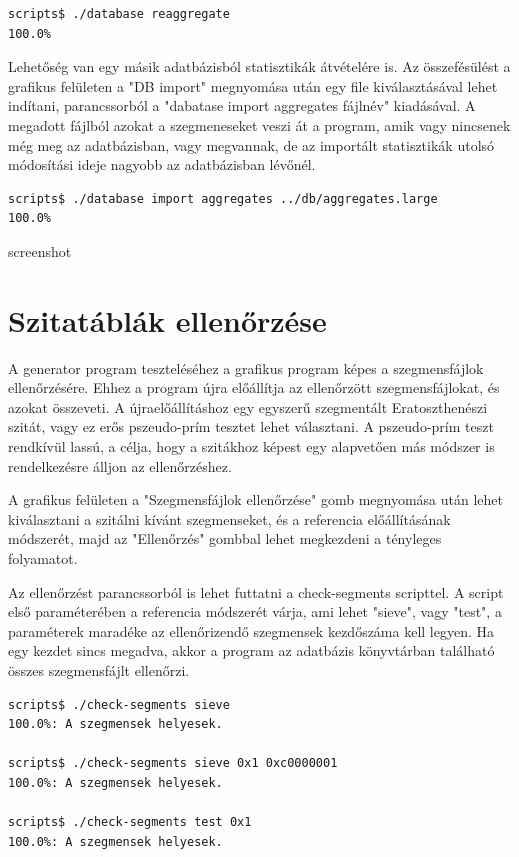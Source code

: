\documentclass[12pt]{report}
\begin{document}
\tiny
\begin{lstlisting}[language=bash]
scripts$ ./database reaggregate
100.0%
\end{lstlisting}
\small

Lehetőség van egy másik adatbázisból statisztikák átvételére is.
Az összefésülést a grafikus felületen a "DB import" megnyomása után
egy file kiválasztásával lehet indítani, parancssorból a "dabatase import aggregates fájlnév"
kiadásával. A megadott fájlból azokat a szegmeneseket veszi át a program,
amik vagy nincsenek még meg az adatbázisban, vagy megvannak, de az importált
statisztikák utolsó módosítási ideje nagyobb az adatbázisban lévőnél.

\tiny
\begin{lstlisting}[language=bash]
scripts$ ./database import aggregates ../db/aggregates.large
100.0%
\end{lstlisting}
\small

{\color{red}screenshot}

\section{Szitatáblák ellenőrzése}

A generator program teszteléséhez a grafikus program képes a szegmensfájlok
ellenőrzésére.
Ehhez a program újra előállítja az ellenőrzött szegmensfájlokat,
és azokat összeveti. A újraelőállításhoz egy egyszerű szegmentált
Eratoszthenészi szitát, vagy ez erős pszeudo-prím tesztet lehet választani.
A pszeudo-prím teszt rendkívül lassú, a célja, hogy a szitákhoz képest egy
alapvetően más módszer is rendelkezésre álljon az ellenőrzéshez.

A grafikus felületen a "Szegmensfájlok ellenőrzése" gomb megnyomása után
lehet kiválasztani a szitálni kívánt szegmenseket, és a referencia előállításának
módszerét, majd az "Ellenőrzés" gombbal lehet megkezdeni a tényleges
folyamatot.

Az ellenőrzést parancssorból is lehet futtatni a check-segments scripttel.
A script első paraméterében a referencia módszerét várja,
ami lehet "sieve", vagy "test", a paraméterek maradéke az ellenőrizendő
szegmensek kezdőszáma kell legyen. Ha egy kezdet sincs megadva, akkor
a program az adatbázis könyvtárban található összes szegmensfájlt ellenőrzi.

\tiny
\begin{lstlisting}[language=bash]
scripts$ ./check-segments sieve
100.0%: A szegmensek helyesek.             

scripts$ ./check-segments sieve 0x1 0xc0000001
100.0%: A szegmensek helyesek.             

scripts$ ./check-segments test 0x1
100.0%: A szegmensek helyesek.             

\end{lstlisting}
\small
\end{document}
